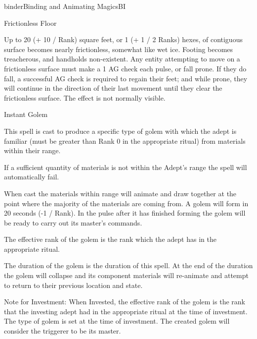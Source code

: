 \begin{college}[1.1]{binder}{Binding and Animating Magics}{BI}
\begin{spell}[S-3]{Frictionless Floor}

\begin{effects}
Up to 20 (+ 10 / Rank) square feet, or 1 (+ 1 / 2 Ranks) hexes, of
contiguous surface becomes nearly frictionless, somewhat like wet
ice. Footing becomes treacherous, and handholds non-existent. Any
entity attempting to move on a frictionless surface must make a 1 \x
AG check each pulse, or fall prone. If they do fall, a successful AG
check is required to regain their feet; and while prone, they will
continue in the direction of their last movement until they clear the
frictionless surface. The effect is not normally visible.
\end{effects}
\end{spell}

\begin{spell}[S-4]{Instant Golem}

\begin{effects}
This spell is cast to produce a specific type of golem with which the
adept is familiar (must be greater than Rank 0 in the appropriate
ritual) from materials within their range.

If a sufficient quantity of materials is not within the Adept's range
the spell will automatically fail.

When cast the materials within range will animate and draw together at
the point where the majority of the materials are coming from.  A
golem will form in 20 seconds (-1 / Rank).  In the pulse after it has
finished forming the golem will be ready to carry out its master's
commands.

The effective rank of the golem is the rank which the adept has in the
appropriate ritual.

The duration of the golem is the duration of this spell.  At the end
of the duration the golem will collapse and its component materials
will re-animate and attempt to return to their previous location and
state.

Note for Investment: When Invested, the effective rank of the golem is
the rank that the investing adept had in the appropriate ritual at the
time of investment.  The type of golem is set at the time of
investment.  The created golem will consider the triggerer to be its
master.


\end{effects}
\end{spell}
\end{college}
